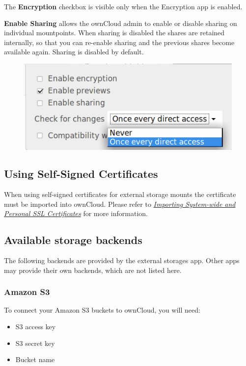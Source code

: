 \documentclass[letterpaper,10pt,english]{sphinxmanual}
\begin{document}
The \textbf{Encryption} checkbox is visible only when the Encryption app is enabled.

\textbf{Enable Sharing} allows the ownCloud admin to enable or disable sharing on individual mountpoints.
When sharing is disabled the shares are retained internally, so that you can re-enable sharing
and the previous shares become available again. Sharing is disabled by default.
\begin{figure}[htbp]
\centering

\includegraphics{mount_options.png}
\end{figure}


\subsection{Using Self-Signed Certificates}
\label{configuration_files/external_storage_configuration_gui:using-self-signed-certificates}
When using self-signed certificates for external storage mounts the certificate
must be imported into ownCloud. Please refer to {\hyperref[configuration_server/import_ssl_cert::doc]{\emph{Importing System-wide and Personal SSL Certificates}}}
for more information.


\subsection{Available storage backends}
\label{configuration_files/external_storage_configuration_gui:available-storage-backends}
The following backends are provided by the external storages app. Other apps
may provide their own backends, which are not listed here.


\subsubsection{Amazon S3}
\label{configuration_files/external_storage/amazons3:amazon-s3}\label{configuration_files/external_storage/amazons3::doc}
To connect your Amazon S3 buckets to ownCloud, you will need:
\begin{itemize}
\item {} 
S3 access key

\item {} 
S3 secret key

\item {} 
Bucket name

\end{itemize}
\end{document}
